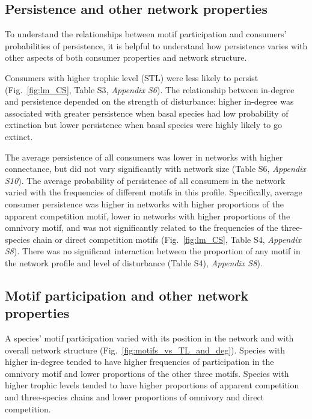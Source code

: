 \documentclass[12pt]{article}
\begin{document}
\begin{spacing}{2.0}
    \subsection*{Persistence and other network properties}

        To understand the relationships between motif participation and consumers' probabilities of persistence, it is helpful to understand how persistence varies with other aspects of both consumer properties and network structure.
        
        Consumers with higher trophic level (STL) were less likely to persist (Fig.~\ref{fig:lm_CS}, Table S3, \emph{Appendix S6}).
        The relationship between in-degree and persistence depended on the strength of disturbance: higher in-degree was associated with greater persistence when basal species had low probability of extinction but lower persistence when basal species were highly likely to go extinct.


        The average persistence of all consumers was lower in networks with higher connectance, but did not vary significantly with network size (Table S6, \emph{Appendix S10}).
        The average probability of persistence of all consumers in the network varied with the frequencies of different motifs in this profile.
        Specifically, average consumer persistence was higher in networks with higher proportions of the apparent competition motif, lower in networks with higher proportions of the omnivory motif, and was not significantly related to the frequencies of the three-species chain or direct competition motifs (Fig.~\ref{fig:lm_CS}, Table S4, \emph{Appendix S8}). 
        There was no significant interaction between the proportion of any motif in the network profile and level of disturbance (Table S4), \emph{Appendix S8}).


    \subsection*{Motif participation and other network properties}


        A species' motif participation varied with its position in the network and with overall network structure (Fig.~\ref{fig:motifs_vs_TL_and_deg}).
        Species with higher in-degree tended to have higher frequencies of participation in the omnivory motif and lower proportions of the other three motifs.
        Species with higher trophic levels tended to have higher proportions of apparent competition and three-species chains and lower proportions of omnivory and direct competition. 
        

\end{spacing}
\end{document}
